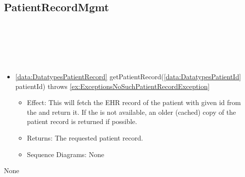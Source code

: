   \subsection{PatientRecordMgmt}\label{int:InterfacesPatientRecordMgmt}
    \begin{description}
      \item[Provided by:] \iconcomponent{}~
      \item[Required by:] \iconcomponent{}~ 
      \item[Operations:] ~
    \begin{itemize}[noitemsep,nolistsep,leftmargin=-.25cm]
      \item \textsf{\ref{data:DatatypesPatientRecord} getPatientRecord(\ref{data:DatatypesPatientId} patientId) throws \ref{ex:ExceptionsNoSuchPatientRecordException}}
        \begin{itemize}[noitemsep,nolistsep]
           \item Effect: This will fetch the EHR record of the patient with given id from the  and return it. If the  is not available, an older (cached) copy of the patient record is returned if possible. 
           \item Returns: The requested patient record.
           \item Sequence Diagrams: None
        \end{itemize}
    \end{itemize}
      \item[Diagrams:] None
    \end{description}

